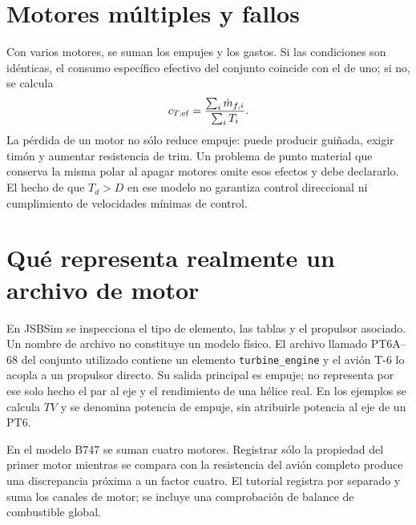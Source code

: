 \section{Motores múltiples y fallos}
Con varios motores, se suman los empujes y los gastos. Si las condiciones son idénticas, el consumo específico efectivo del conjunto coincide con el de uno; si no, se calcula
\begin{equation}
c_{T,\rm ef}=\frac{\sum_i\dot m_{f,i}}{\sum_iT_i}.
\end{equation}
La pérdida de un motor no sólo reduce empuje: puede producir guiñada, exigir timón y aumentar resistencia de trim. Un problema de punto material que conserva la misma polar al apagar motores omite esos efectos y debe declararlo. El hecho de que $T_d>D$ en ese modelo no garantiza control direccional ni cumplimiento de velocidades mínimas de control.

\section{Qué representa realmente un archivo de motor}
En JSBSim se inspecciona el tipo de elemento, las tablas y el propulsor asociado. Un nombre de archivo no constituye un modelo físico. El archivo llamado PT6A--68 del conjunto utilizado contiene un elemento \texttt{turbine\_engine} y el avión T-6 lo acopla a un propulsor directo. Su salida principal es empuje; no representa por ese solo hecho el par al eje y el rendimiento de una hélice real. En los ejemplos se calcula $TV$ y se denomina potencia de empuje, sin atribuirle potencia al eje de un PT6.

En el modelo B747 se suman cuatro motores. Registrar sólo la propiedad del primer motor mientras se compara con la resistencia del avión completo produce una discrepancia próxima a un factor cuatro. El tutorial registra por separado y suma los canales de motor; se incluye una comprobación de balance de combustible global.



